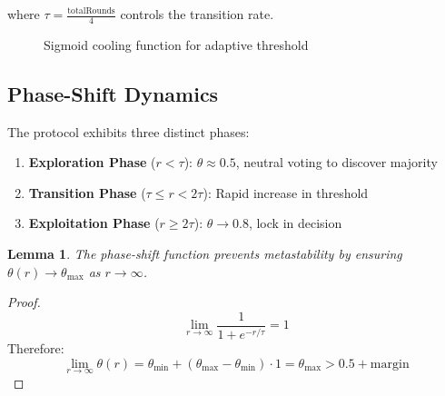 \documentclass[11pt,a4paper]{article}
\newtheorem{lemma}[theorem]{Lemma}
\begin{document}
where $\tau = \frac{\text{totalRounds}}{4}$ controls the transition rate.

\begin{figure}[h]
\centering
{}
\caption{Sigmoid cooling function for adaptive threshold}
\label{fig:sigmoid}
\end{figure}

\subsection{Phase-Shift Dynamics}

The protocol exhibits three distinct phases:

\begin{enumerate}
\item \textbf{Exploration Phase} ($r < \tau$): $\theta \approx 0.5$, neutral voting to discover majority
\item \textbf{Transition Phase} ($\tau \leq r < 2\tau$): Rapid increase in threshold
\item \textbf{Exploitation Phase} ($r \geq 2\tau$): $\theta \to 0.8$, lock in decision
\end{enumerate}

\begin{lemma}
The phase-shift function prevents metastability by ensuring $\theta(r) \to \theta_{\max}$ as $r \to \infty$.
\end{lemma}

\begin{proof}
$$\lim_{r \to \infty} \frac{1}{1 + e^{-r/\tau}} = 1$$
Therefore:
$$\lim_{r \to \infty} \theta(r) = \theta_{\min} + (\theta_{\max} - \theta_{\min}) \cdot 1 = \theta_{\max} > 0.5 + \text{margin}$$
\end{proof}
\end{document}
